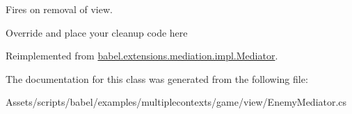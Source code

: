 Fires on removal of view. 

Override and place your cleanup code here 

Reimplemented from \hyperlink{classbabel_1_1extensions_1_1mediation_1_1impl_1_1_mediator_a8b818665eda883eac66c83b8468007e9}{babel.\-extensions.\-mediation.\-impl.\-Mediator}.



The documentation for this class was generated from the following file\-:\begin{DoxyCompactItemize}
\item 
Assets/scripts/babel/examples/multiplecontexts/game/view/Enemy\-Mediator.\-cs\end{DoxyCompactItemize}
